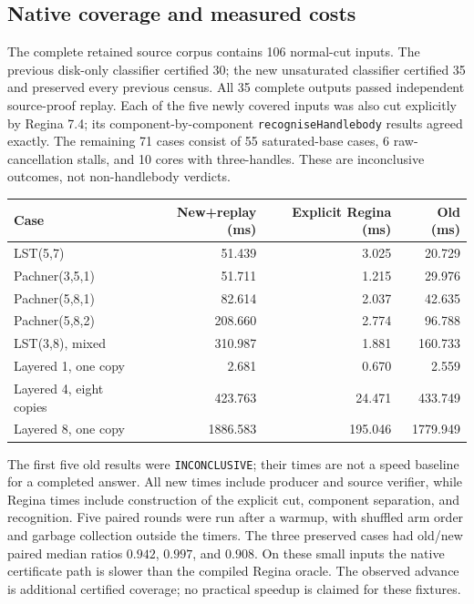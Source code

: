\subsection{Native coverage and measured costs}

The complete retained source corpus contains 106 normal-cut inputs.  The
previous disk-only classifier certified 30; the new unsaturated classifier
certified 35 and preserved every previous census.  All 35 complete outputs
passed independent source-proof replay.  Each of the five newly covered
inputs was also cut explicitly by Regina 7.4; its component-by-component
\texttt{recogniseHandlebody} results agreed exactly.  The remaining 71 cases
consist of 55 saturated-base cases, 6 raw-cancellation stalls, and 10 cores
with three-handles.  These are inconclusive outcomes, not non-handlebody
verdicts.

\begin{center}
\begin{tabular}{lrrr}
\hline
Case & New+replay (ms) & Explicit Regina (ms) & Old (ms)\\
\hline
LST(5,7) & 51.439 & 3.025 & 20.729\\
Pachner(3,5,1) & 51.711 & 1.215 & 29.976\\
Pachner(5,8,1) & 82.614 & 2.037 & 42.635\\
Pachner(5,8,2) & 208.660 & 2.774 & 96.788\\
LST(3,8), mixed & 310.987 & 1.881 & 160.733\\
Layered 1, one copy & 2.681 & 0.670 & 2.559\\
Layered 4, eight copies & 423.763 & 24.471 & 433.749\\
Layered 8, one copy & 1886.583 & 195.046 & 1779.949\\
\hline
\end{tabular}
\end{center}

The first five old results were \texttt{INCONCLUSIVE}; their times are not
a speed baseline for a completed answer.  All new times include producer
and source verifier, while Regina times include construction of the
explicit cut, component separation, and recognition.  Five paired rounds
were run after a warmup, with shuffled arm order and garbage collection
outside the timers.  The three preserved cases had old/new paired median
ratios $0.942$, $0.997$, and $0.908$.  On these small inputs the native
certificate path is slower than the compiled Regina oracle.  The observed
advance is additional certified coverage; no practical speedup is claimed
for these fixtures.

